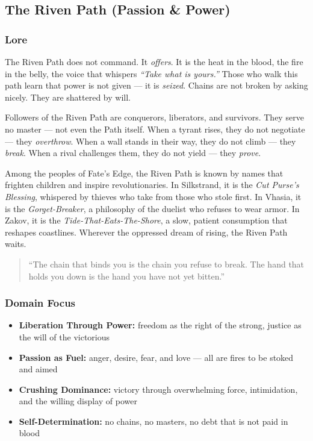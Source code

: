 
\subsection{The Riven Path (Passion \& Power)}

\subsubsection*{Lore}
The Riven Path does not command. It \textit{offers}. It is the heat in the blood, the fire in the belly, the voice that whispers \textit{``Take what is yours.''} Those who walk this path learn that power is not given --- it is \textit{seized}. Chains are not broken by asking nicely. They are shattered by will.

Followers of the Riven Path are conquerors, liberators, and survivors. They serve no master --- not even the Path itself. When a tyrant rises, they do not negotiate --- they \textit{overthrow}. When a wall stands in their way, they do not climb --- they \textit{break}. When a rival challenges them, they do not yield --- they \textit{prove}.

Among the peoples of Fate's Edge, the Riven Path is known by names that frighten children and inspire revolutionaries. In Silkstrand, it is the \textit{Cut Purse's Blessing}, whispered by thieves who take from those who stole first. In Vhasia, it is the \textit{Gorget-Breaker}, a philosophy of the duelist who refuses to wear armor. In Zakov, it is the \textit{Tide-That-Eats-The-Shore}, a slow, patient consumption that reshapes coastlines. Wherever the oppressed dream of rising, the Riven Path waits.

\begin{quote}
``The chain that binds you is the chain you refuse to break. The hand that holds you down is the hand you have not yet bitten.''
\end{quote}

\subsubsection*{Domain Focus}
\begin{itemize}
  \item \textbf{Liberation Through Power:} freedom as the right of the strong, justice as the will of the victorious
  \item \textbf{Passion as Fuel:} anger, desire, fear, and love --- all are fires to be stoked and aimed
  \item \textbf{Crushing Dominance:} victory through overwhelming force, intimidation, and the willing display of power
  \item \textbf{Self-Determination:} no chains, no masters, no debt that is not paid in blood
\end{itemize}

